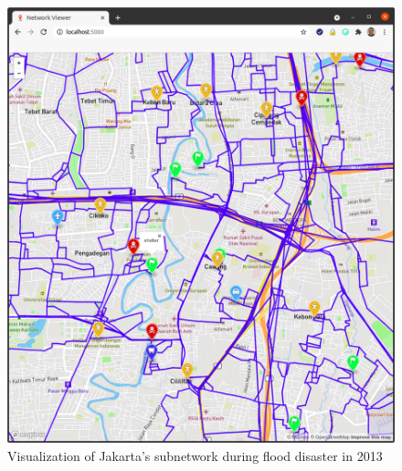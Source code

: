 \documentclass[conference]{IEEEtran}
\begin{document}
\begin{figure}
\centerline{\includegraphics[scale=0.24]{subnetwork-visualization-zoom-1-jakarta.png}}
\caption{Visualization of Jakarta's subnetwork during flood disaster in 2013}
\label{fig_jakarta_subnetwork_visualized}
\end{figure}
\end{document}
